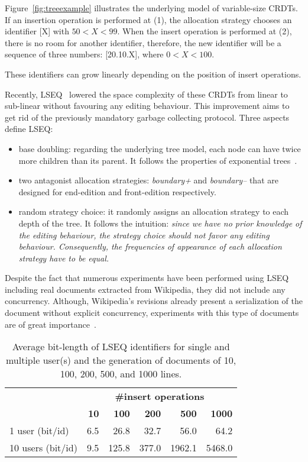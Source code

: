 Figure~\ref{fig:treeexample} illustrates the underlying model of variable-size
CRDTs.  If an insertion operation is performed at (1), the allocation strategy
chooses an identifier [X] with $50<X<99$. When the insert operation is
performed at (2), there is no room for another identifier, therefore, the new
identifier will be a sequence of three numbers: [20.10.X], where $0<X<100$.

These identifiers can grow linearly depending on the position of insert
operations.

Recently, LSEQ~\cite{nedelec2013lseq} lowered the space complexity of these
CRDTs from linear to sub-linear without favouring any editing behaviour. This
improvement aims to get rid of the previously mandatory garbage collecting
protocol. Three aspects define LSEQ:
\begin{itemize}
\item{base doubling:} regarding the underlying tree model, each node can have
  twice more children than its parent. It follows the properties of exponential
  trees~\cite{andersson2007dynamic}.
\item{two antagonist allocation strategies:} \emph{boundary+} and
  \emph{boundary--} that are designed for end-edition and front-edition
  respectively.
\item{random strategy choice:} it randomly assigns an allocation strategy to
  each depth of the tree. It follows the intuition: \emph{since we have no
    prior knowledge of the editing behaviour, the strategy choice should not
    favor any editing behaviour. Consequently, the frequencies of appearance of
    each allocation strategy have to be equal.}
\end{itemize}

Despite the fact that numerous experiments have been performed using LSEQ
including real documents extracted from Wikipedia, they did not include any
concurrency. Although, Wikipedia's revisions already present a serialization of
the document without explicit concurrency, experiments with this type of
documents are of great importance~\cite{ahmed2011evaluating}.

\begin{table}[h]
  \begin{center}
    \begin{tabular}{|l|r|r|r|r|r|}
      \cline{2-6}
      \multicolumn{1}{c|}{} & \multicolumn{5}{c|}{\textbf{\#insert operations}}
      \\
      \multicolumn{1}{c|}{} & \textbf{10} & \textbf{100} & \textbf{200}
      & \textbf{500} & \textbf{1000} \\
      \hline
      1 user (bit/id) & 6.5 & 26.8 & 32.7 & 56.0 & 64.2 \\
      \hline
      10 users (bit/id) & 9.5 & 125.8 & 377.0 & 1962.1 & 5468.0 \\
      \hline
    \end{tabular}
    \caption{Average bit-length of LSEQ identifiers for single and multiple
      user(s) and the generation of documents of 10, 100, 200, 500, and 1000
      lines.}
    \label{tab:motivating}
  \end{center}
\end{table} 

